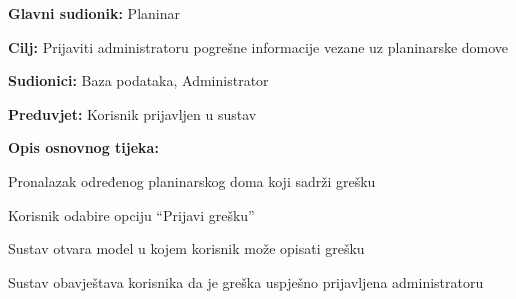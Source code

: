 		\noindent {}
		\begin{packed_item}
			
			\item \textbf{Glavni sudionik: }$ $Planinar$ $
			\item  \textbf{Cilj:} $ $Prijaviti administratoru pogrešne informacije vezane uz planinarske domove$ $
			\item  \textbf{Sudionici:} $ $Baza podataka, Administrator $ $
			\item  \textbf{Preduvjet:} $ $Korisnik prijavljen u sustav $ $
			\item  \textbf{Opis osnovnog tijeka:}
			
			\item[] \begin{packed_enum}
				
				\item $ $Pronalazak određenog planinarskog doma koji sadrži grešku $ $
				\item $ $Korisnik odabire opciju “Prijavi grešku”$ $
				\item $ $Sustav otvara model u kojem korisnik može opisati grešku 
				\item $ $Sustav obavještava korisnika da je greška uspješno prijavljena administratoru$ $
				
			\end{packed_enum}
		\end{packed_item}
	
